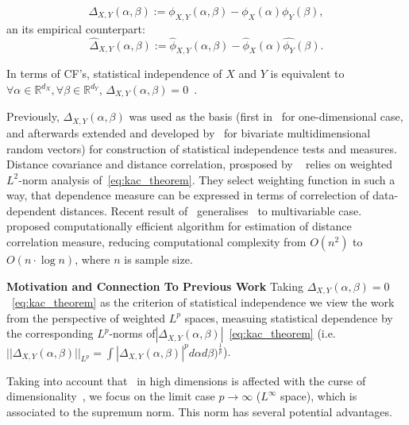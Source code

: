 \documentclass{article}
\begin{document}
\begin{equation}
\label{eq:kac_theorem}
\Delta_{X,Y}(\alpha, \beta) := \phi_{X,Y}(\alpha,\beta) - \phi_{X}(\alpha) \phi_{Y}(\beta),
\end{equation}
an its empirical counterpart:
\begin{equation}
\label{eq:empirical_delta}
\widehat{\Delta}_{X,Y}(\alpha, \beta) := \widehat{\phi}_{X,Y}(\alpha,\beta) - \widehat{\phi}_{X}(\alpha) \widehat{\phi_{Y}}(\beta).
\end{equation}

In terms of CF's, statistical independence  of $X$ and $Y$ is equivalent to $\forall \alpha \in \mathbb{R}^{d_X},\forall \beta \in \mathbb{R}^{d_Y} $, $\Delta_{X,Y}(\alpha, \beta) = 0$~\cite{KacTheorem}.

Previously, $\Delta_{X,Y}(\alpha, \beta)$ was used as the basis (first in~\cite{Feuerverger} for one-dimensional case, and afterwards extended and developed by~\cite{Szekely} for bivariate multidimensional random vectors) for construction of statistical independence tests and measures. Distance covariance and distance correlation, prosposed by ~\cite{Szekely} relies on weighted $L^{2}$-norm analysis of~\eqref{eq:kac_theorem}. They select weighting function in such a way, that dependence measure can be expressed in terms of correlection of data-dependent distances. Recent result of~\cite{Bottcher} generalises~\cite{Szekely} to multivariable case.~\cite{CHAUDHURI201915} proposed computationally efficient algorithm for estimation of distance correlation measure, reducing computational complexity from $O(n^2)$ to $O(n\cdot \log n)$, where $n$ is sample size.

\textbf{Motivation and Connection To Previous Work} 
Taking $\Delta_{X,Y}(\alpha, \beta) = 0$~\eqref{eq:kac_theorem} as the criterion of statistical independence we view the work~\cite{Szekely} from the perspective of weighted $L^{p}$ spaces, measuing statistical dependence by the corresponding $L^{p}$-norms of$|\Delta_{X,Y}(\alpha, \beta)|$~\eqref{eq:kac_theorem} (i.e. $||\Delta_{X,Y}(\alpha, \beta)||_{L^{p}} = \int |\Delta_{X,Y}(\alpha, \beta)|^{p} d\alpha d\beta)^{\frac{1}{p}}$).

Taking into account that~\cite{Szekely} in high dimensions is affected with the curse of dimensionality~\cite{Edlemann}, we focus on the limit case $p \rightarrow \infty$ ($L^{\infty}$ space), which is associated to the supremum norm. This norm has several potential advantages.
\end{document}
